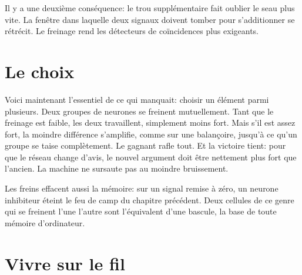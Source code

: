 
Il y a une deuxième conséquence: le trou supplémentaire fait oublier le seau plus vite. La fenêtre dans laquelle deux signaux doivent tomber pour s'additionner se rétrécit. Le freinage rend les détecteurs de coïncidences plus exigeants.

\section*{Le choix}

Voici maintenant l'essentiel de ce qui manquait: choisir un élément parmi plusieurs. Deux groupes de neurones se freinent mutuellement. Tant que le freinage est faible, les deux travaillent, simplement moins fort. Mais s'il est assez fort, la moindre différence s'amplifie, comme sur une balançoire, jusqu'à ce qu'un groupe se taise complètement. Le gagnant rafle tout. Et la victoire tient: pour que le réseau change d'avis, le nouvel argument doit être nettement plus fort que l'ancien. La machine ne sursaute pas au moindre bruissement.

Les freins effacent aussi la mémoire: sur un signal \og remise à zéro\fg{}, un neurone inhibiteur éteint le feu de camp du chapitre précédent. Deux cellules de ce genre qui se freinent l'une l'autre sont l'équivalent d'une bascule, la base de toute mémoire d'ordinateur.

\section*{Vivre sur le fil}

